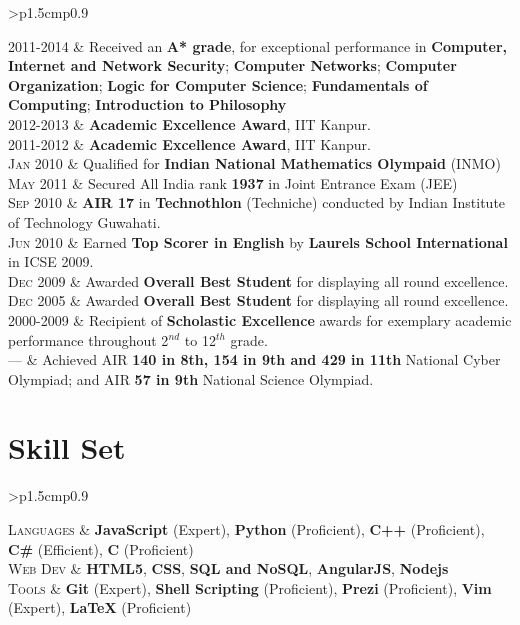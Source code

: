 \documentclass[a4paper,10pt]{article} %
\newcommand{\itemlist}[1]{
    \begin{tabular}{>{\raggedleft}p{1.5cm}p{0.9\linewidth}}
        #1
    \end{tabular}
}
\begin{document}
\itemlist {
    \textsc{2011-2014}   & Received an \textbf{A* grade}, for exceptional performance in
                            \textbf{Computer, Internet and Network Security};
                            \textbf{Computer Networks};
                            \textbf{Computer Organization};
                            \textbf{Logic for Computer Science};
                            \textbf{Fundamentals of Computing};
                            \textbf{Introduction to Philosophy} \\
    \textsc{2012-2013}   & \textbf{Academic Excellence Award}, IIT Kanpur. \\
    \textsc{2011-2012}   & \textbf{Academic Excellence Award}, IIT Kanpur. \\
    \textsc{Jan 2010}    & Qualified for \textbf{Indian National Mathematics Olympaid} (INMO) \\
    \textsc{May 2011}    & Secured All India rank \textbf{1937} in Joint Entrance Exam (JEE) \\
    \textsc{Sep 2010}    & \textbf{AIR 17} in \textbf{Technothlon} (Techniche) conducted by Indian Institute of Technology Guwahati. \\
    \textsc{Jun 2010}    & Earned \textbf{Top Scorer in English} by \textbf{Laurels School International} in ICSE 2009. \\
    \textsc{Dec 2009}    & Awarded \textbf{Overall Best Student} for displaying all round excellence. \\
    \textsc{Dec 2005}    & Awarded \textbf{Overall Best Student} for displaying all round excellence. \\
    \textsc{2000-2009}   & Recipient of \textbf{Scholastic Excellence} awards for exemplary academic performance throughout
                            2$^{nd}$ to 12$^{th}$ grade. \\
    \textsc{---}         & Achieved AIR \textbf{140 in 8th, 154 in 9th and 429 in 11th} National Cyber Olympiad;
                            and AIR \textbf{57 in 9th} National Science Olympiad.\\
}


\section{Skill Set}

\itemlist {
    \textsc{Languages} %
            & \textbf{JavaScript} (Expert), \textbf{Python} (Proficient), \textbf{C++} (Proficient), \textbf{C\#} (Efficient),
              \textbf{C} (Proficient)\\
    \textsc{Web Dev} %
            & \textbf{HTML5}, \textbf{CSS}, \textbf{SQL and NoSQL}, \textbf{AngularJS}, \textbf{Nodejs}\\
    \textsc{Tools} %
            & \textbf{Git} (Expert), \textbf{Shell Scripting} (Proficient), \textbf{Prezi} (Proficient), \textbf{Vim} (Expert), \textbf{LaTeX}
              (Proficient)\\
}
\end{document}
